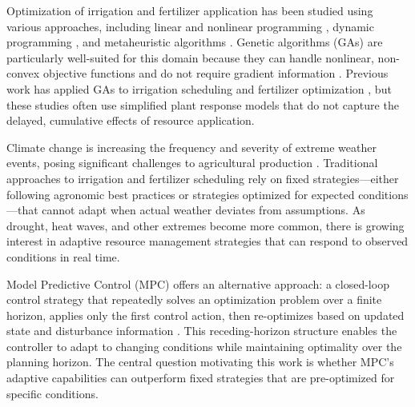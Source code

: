 \documentclass[pdflatex,sn-mathphys-num]{sn-jnl}
\begin{document}
Optimization of irrigation and fertilizer application has been studied using various approaches, including linear and nonlinear programming \cite{irrigation-optimization}, dynamic programming \cite{dp-irrigation}, and metaheuristic algorithms \cite{ga-agriculture}. Genetic algorithms (GAs) are particularly well-suited for this domain because they can handle nonlinear, non-convex objective functions and do not require gradient information \cite{goldberg1989ga}. Previous work has applied GAs to irrigation scheduling \cite{ga-irrigation-scheduling} and fertilizer optimization \cite{ga-fertilizer}, but these studies often use simplified plant response models that do not capture the delayed, cumulative effects of resource application.

Climate change is increasing the frequency and severity of extreme weather events, posing significant challenges to agricultural production \cite{ipcc2021}. Traditional approaches to irrigation and fertilizer scheduling rely on fixed strategies---either following agronomic best practices or strategies optimized for expected conditions---that cannot adapt when actual weather deviates from assumptions. As drought, heat waves, and other extremes become more common, there is growing interest in adaptive resource management strategies that can respond to observed conditions in real time.

Model Predictive Control (MPC) offers an alternative approach: a closed-loop control strategy that repeatedly solves an optimization problem over a finite horizon, applies only the first control action, then re-optimizes based on updated state and disturbance information \cite{rawlings2017mpc}. This receding-horizon structure enables the controller to adapt to changing conditions while maintaining optimality over the planning horizon. The central question motivating this work is whether MPC's adaptive capabilities can outperform fixed strategies that are pre-optimized for specific conditions.
\end{document}

